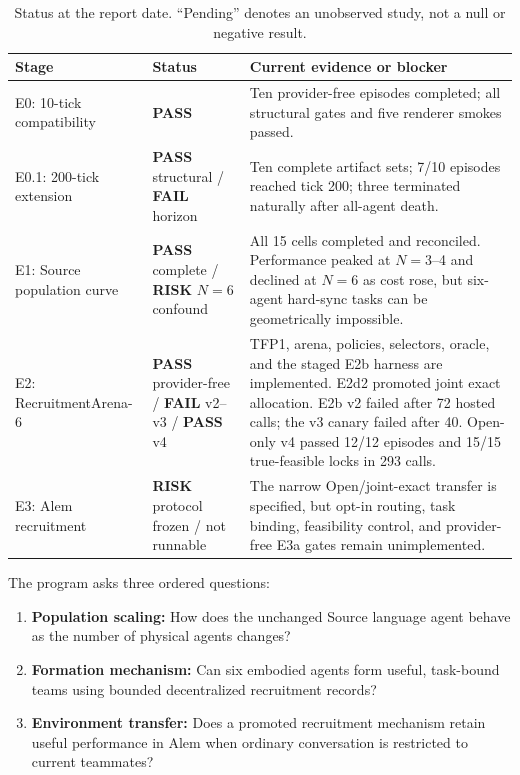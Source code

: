 \documentclass[11pt]{article}
\newcommand{\pass}{\textcolor{passgreen}{\textbf{PASS}}}
\newcommand{\fail}{\textcolor{failred}{\textbf{FAIL}}}
\newcommand{\risk}{\textcolor{warningamber}{\textbf{RISK}}}
\begin{document}
\begin{table}[ht]
\centering
\small
\begin{tabularx}{\textwidth}{@{}l l X@{}}
\toprule
Stage & Status & Current evidence or blocker\\
\midrule
E0: 10-tick compatibility & \pass &
Ten provider-free episodes completed; all structural gates and five renderer
smokes passed.\\
E0.1: 200-tick extension & \pass{} structural / \fail{} horizon &
Ten complete artifact sets; 7/10 episodes reached tick 200; three terminated
naturally after all-agent death.\\
E1: Source population curve & \pass{} complete / \risk{} $N=6$ confound &
All 15 cells completed and reconciled.  Performance peaked at $N=3$--4 and
declined at $N=6$ as cost rose, but six-agent hard-sync tasks can be
geometrically impossible.\\
E2: RecruitmentArena-6 & \pass{} provider-free / \fail{} v2--v3 / \pass{} v4 &
TFP1, arena, policies, selectors, oracle, and the staged E2b harness are
implemented.  E2d2 promoted joint exact allocation.  E2b v2 failed after 72
hosted calls; the v3 canary failed after 40.  Open-only v4 passed 12/12
episodes and 15/15 true-feasible locks in 293 calls.\\
E3: Alem recruitment & \risk{} protocol frozen / not runnable &
The narrow Open/joint-exact transfer is specified, but opt-in routing, task
binding, feasibility control, and provider-free E3a gates remain unimplemented.\\
\bottomrule
\end{tabularx}
\caption{Status at the report date.  ``Pending'' denotes an unobserved study,
not a null or negative result.}
\label{tab:status}
\end{table}

The program asks three ordered questions:

\begin{enumerate}
  \item \textbf{Population scaling:} How does the unchanged Source language
  agent behave as the number of physical agents changes?
  \item \textbf{Formation mechanism:} Can six embodied agents form useful,
  task-bound teams using bounded decentralized recruitment records?
  \item \textbf{Environment transfer:} Does a promoted recruitment mechanism
  retain useful performance in Alem when ordinary conversation is restricted
  to current teammates?
\end{enumerate}
\end{document}
